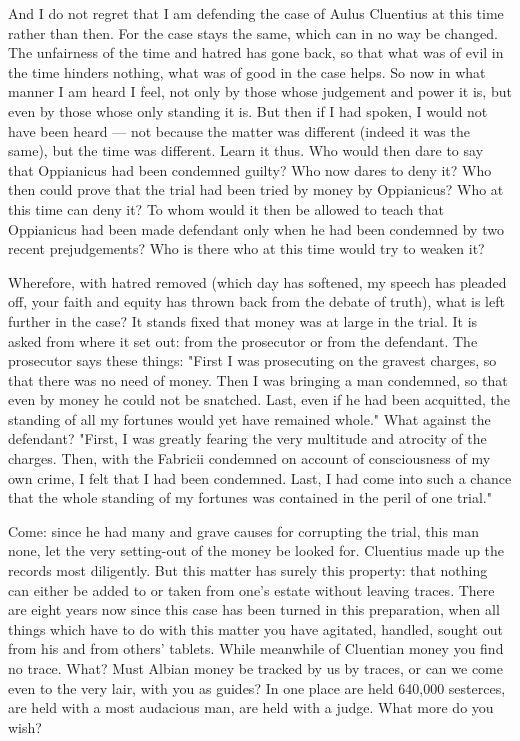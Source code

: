  And I do not regret that I am defending the case of Aulus Cluentius at this time rather than then. For the case stays the same, which can in no way be changed. The unfairness of the time and hatred has gone back, so that what was of evil in the time hinders nothing, what was of good in the case helps. So now in what manner I am heard I feel, not only by those whose judgement and power it is, but even by those whose only standing it is. But then if I had spoken, I would not have been heard --- not because the matter was different (indeed it was the same), but the time was different. Learn it thus. Who would then dare to say that Oppianicus had been condemned guilty? Who now dares to deny it? Who then could prove that the trial had been tried by money by Oppianicus? Who at this time can deny it? To whom would it then be allowed to teach that Oppianicus had been made defendant only when he had been condemned by two recent prejudgements? Who is there who at this time would try to weaken it?

 Wherefore, with hatred removed (which day has softened, my speech has pleaded off, your faith and equity has thrown back from the debate of truth), what is left further in the case? It stands fixed that money was at large in the trial. It is asked from where it set out: from the prosecutor or from the defendant. The prosecutor says these things: "First I was prosecuting on the gravest charges, so that there was no need of money. Then I was bringing a man condemned, so that even by money he could not be snatched. Last, even if he had been acquitted, the standing of all my fortunes would yet have remained whole." What against the defendant? "First, I was greatly fearing the very multitude and atrocity of the charges. Then, with the Fabricii condemned on account of consciousness of my own crime, I felt that I had been condemned. Last, I had come into such a chance that the whole standing of my fortunes was contained in the peril of one trial."

 Come: since he had many and grave causes for corrupting the trial, this man none, let the very setting-out of the money be looked for. Cluentius made up the records most diligently. But this matter has surely this property: that nothing can either be added to or taken from one's estate without leaving traces. There are eight years now since this case has been turned in this preparation, when all things which have to do with this matter you have agitated, handled, sought out from his and from others' tablets. While meanwhile of Cluentian money you find no trace. What? Must Albian money be tracked by us by traces, or can we come even to the very lair, with you as guides? In one place are held 640,000 sesterces, are held with a most audacious man, are held with a judge. What more do you wish?

